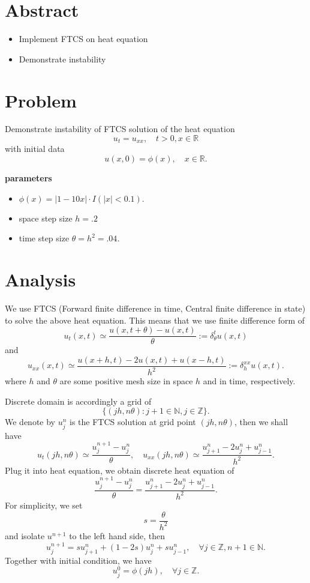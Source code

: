 \documentclass{article}
\begin{document}
\section{Abstract}
\begin{itemize}
 \item Implement FTCS on heat equation
 \item Demonstrate instability
\end{itemize}

\section{Problem}
Demonstrate instability of FTCS solution of the heat equation
$$u_t = u_{xx}, \quad t>0, x\in \mathbb R$$
with initial data
$$
u(x, 0) = \phi(x), \quad x\in \mathbb R.
$$

{\bf parameters}

\begin{itemize}
 \item $\phi(x) = |1 - 10 x| \cdot I (|x| <0.1).$
 \item space step size $h = .2$
 \item time step size $\theta = h^2 = .04$.

\end{itemize}


\section{Analysis}

We use FTCS (Forward finite difference in time, Central finite difference in state) to solve the above heat equation. This means that we use finite difference form of
$$u_{t}(x, t) \simeq \frac{u(x, t+ \theta) - u(x, t)}{\theta} := 
\delta^{t}_{\theta} u (x, t)$$
and
$$u_{xx}(x, t) \simeq \frac{u(x+h, t) - 2u(x, t) + u(x-h, t)}{h^{2}}
:= \delta^{xx}_{h} u (x, t).$$
where $h$ and $\theta$ are some positive 
mesh size in space $h$ and in time, respectively. 

Discrete domain is accordingly a grid of
$$\{(jh, n\theta): j +1 \in \mathbb N, j\in \mathbb Z\}.$$
We denote by $u_{j}^{n}$ is the FTCS solution at grid point $(jh, n\theta)$, 
then we shall have
$$u_{t}(jh, n\theta) \simeq \frac{u_{j}^{n+1} - u_{j}^{n}}{\theta}, 
\quad u_{xx}(jh, n\theta) \simeq 
\frac{u_{j+1}^{n} - 2u_{j}^{n} + u_{j-1}^{n}}{h^{2}}.$$
Plug it into heat equation, we obtain discrete heat equation of
$$
\frac{u_{j}^{n+1} - u_{j}^{n}}{\theta} = \frac{u_{j+1}^{n} - 2u_{j}^{n} + u_{j-1}^{n}}{h^{2}}.
$$
For simplicity, we set
$$s = \frac{\theta}{h^{2}}$$
and isolate $u^{n+1}$ to the left hand side, then
\begin{equation}
\label{eq:ftcs01}
u_{j}^{n+1} = s u_{j+1}^{n} + (1-2s) u_{j}^{n} + s u_{j-1}^{n}, \quad \forall j\in \mathbb Z, n+1 \in \mathbb N. 
\end{equation}
Together with initial condition, we have
\begin{equation}
 \label{eq:ftcs00}
 u_{j}^{0} = \phi(jh), \quad \forall j\in \mathbb Z.
\end{equation}
\end{document}
